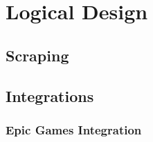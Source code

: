 \section{Logical Design}
\label{sec:LogicalDesign}
\subsection{Scraping}
\label{subsec:Scraping}
\subsection{Integrations}
\label{subsec:Integrations}
\subsubsection{Epic Games Integration}
\label{subsubsec:EpicInt}
